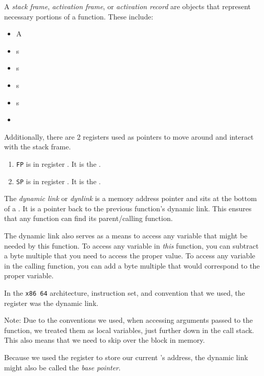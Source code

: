 \begin{definition}\label{def:Stack_Frame}
  A \emph{stack frame}, \emph{activation frame}, or \emph{activation record} are objects that represent necessary portions of a function.
  These include:
  \begin{itemize}[noitemsep]
  \item A 
  \item {}s
  \item {}s
  \item {}s
  \item {}s
  \item {}
  \end{itemize}

  Additionally, there are 2 registers used as pointers to move around and interact with the stack frame.
  \begin{enumerate}[noitemsep]
  \item \texttt{FP} is in register \rbpRegister{}. It is the .
  \item \texttt{SP} is in register \rspRegister{}. It is the .
  \end{enumerate}
\end{definition}

\begin{definition}\label{def:Dynamic_Link}
  The \emph{dynamic link} or \emph{dynlink} is a memory address pointer and sits at the bottom of a .
  It is a pointer back to the previous function's dynamic link.
  This ensures that any function can find its parent/calling function.

  The dynamic link also serves as a means to access any variable that might be needed by this function.
  To access any variable in \emph{this} function, you can subtract a byte multiple that you need to access the proper value.
  To access any variable in the calling function, you can add a byte multiple that would correspond to the proper variable.

    In the \texttt{x86\textunderscore{} 64} architecture, instruction set, and convention that we used, the register \rbpRegister{} was the dynamic link.
  \begin{remark}
    Note: Due to the conventions we used, when accessing arguments passed to the function, we treated them as local variables, just further down in the call stack.
    This also means that we need to skip over the  block in memory.
  \end{remark}

  \begin{remark}
    Because we used the \rbpRegister{} register to store our current 's address, the dynamic link might also be called the \emph{base pointer}.
  \end{remark}
\end{definition}


